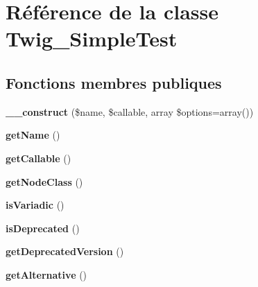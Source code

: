 \hypertarget{class_twig___simple_test}{}\section{Référence de la classe Twig\+\_\+\+Simple\+Test}
\label{class_twig___simple_test}
\subsection*{Fonctions membres publiques}
\begin{DoxyCompactItemize}
\item 
{\bfseries \+\_\+\+\_\+construct} (\$name, \$callable, array \$options=array())\hypertarget{class_twig___simple_test_a1e24fc85f3981c10f1e71d93a4f54144}{}\label{class_twig___simple_test_a1e24fc85f3981c10f1e71d93a4f54144}

\item 
{\bfseries get\+Name} ()\hypertarget{class_twig___simple_test_a3d0963e68bb313b163a73f2803c64600}{}\label{class_twig___simple_test_a3d0963e68bb313b163a73f2803c64600}

\item 
{\bfseries get\+Callable} ()\hypertarget{class_twig___simple_test_a0be839e0782a38a172c386bd963375c9}{}\label{class_twig___simple_test_a0be839e0782a38a172c386bd963375c9}

\item 
{\bfseries get\+Node\+Class} ()\hypertarget{class_twig___simple_test_a8d85021f1f19e71dd99d7dfdd138c927}{}\label{class_twig___simple_test_a8d85021f1f19e71dd99d7dfdd138c927}

\item 
{\bfseries is\+Variadic} ()\hypertarget{class_twig___simple_test_ab2aa651fb210b4868f4c2a846ab40ebb}{}\label{class_twig___simple_test_ab2aa651fb210b4868f4c2a846ab40ebb}

\item 
{\bfseries is\+Deprecated} ()\hypertarget{class_twig___simple_test_aef821f8e8449d82f3dc3b9e3bcc24ed5}{}\label{class_twig___simple_test_aef821f8e8449d82f3dc3b9e3bcc24ed5}

\item 
{\bfseries get\+Deprecated\+Version} ()\hypertarget{class_twig___simple_test_a2ba6a5f35ed4a08151f080a32943c2d0}{}\label{class_twig___simple_test_a2ba6a5f35ed4a08151f080a32943c2d0}

\item 
{\bfseries get\+Alternative} ()\hypertarget{class_twig___simple_test_aaa68d6b85ed3f3f66c20ebeacb96496d}{}\label{class_twig___simple_test_aaa68d6b85ed3f3f66c20ebeacb96496d}

\end{DoxyCompactItemize}
